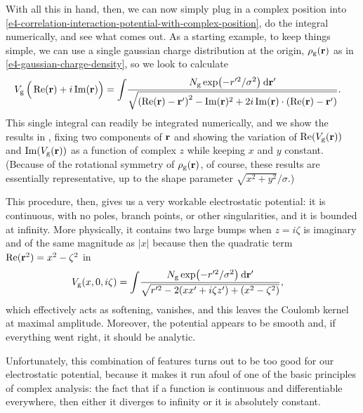 With all this in hand, then, we can now simply plug in a complex position into \eqref{e4-correlation-interaction-potential-with-complex-position}, do the integral numerically, and see what comes out. As a starting example, to keep things simple, we can use a single gaussian charge distribution at the origin, $\rho_\mathrm{g}(\vb{r})$ as in \eqref{e4-gaussian-charge-density}, so we look to calculate
\begin{align}
V_\mathrm{g}\left(\vphantom{\sum} \Re(\vb{r})+i\Im(\vb{r})\right)
& =
\int\!
\frac{
  N_\mathrm{g} \exp(-r'^2/\sigma^2)
  \: \mathrm{d}\vb{r}'
  }{
  \sqrt{ \left( \Re(\vb{r})-\vb{r}' \right)^2 - \Im(\vb{r})^2 + 2i\Im(\vb{r})\cdot (\Re(\vb{r})-\vb{r}')}
  }
.
\label{e4-correlation-interaction-potential-numerically-gaussian}
\end{align}
This single integral can readily be integrated numerically, and we show the results in , fixing two components of $\vb{r}$ and showing the variation of $\Re(V_\mathrm{g}(\vb{r}))$ and $\Im(V_\mathrm{g}(\vb{r}))$ as a function of complex $z$ while keeping $x$ and $y$ constant. (Because of the rotational symmetry of $\rho_\mathrm{g}(\vb{r})$, of course, these results are essentially representative, up to the shape parameter $\sqrt{x^2+y^2}/\sigma$.)




This procedure, then, gives us a very workable electrostatic potential: it is continuous, with no poles, branch points, or other singularities, and it is bounded at infinity. More physically, it contains two large bumps when $z=i\zeta$ is imaginary and of the same magnitude as $|x|$ because then the quadratic term $\Re(\vb{r}^2)=x^2-\zeta^2$ in
\begin{align}
V_\mathrm{g}(x,0,i\zeta)
& =
\int\!
\frac{
  N_\mathrm{g} \exp(-r'^2/\sigma^2)
  \: \mathrm{d}\vb{r}'
  }{
  \sqrt{r'^2-2(xx'+i\zeta z')+(x^2-\zeta^2)}
  }
,
\end{align}
which effectively acts as softening, vanishes, and this leaves the Coulomb kernel at maximal amplitude. Moreover, the potential appears to be smooth and, if everything went right, it should be analytic.





Unfortunately, this combination of features turns out to be too good for our electrostatic potential, because it makes it run afoul of one of the basic principles of complex analysis: the fact that if a function is continuous and differentiable everywhere, then either it diverges to infinity or it is absolutely constant.





